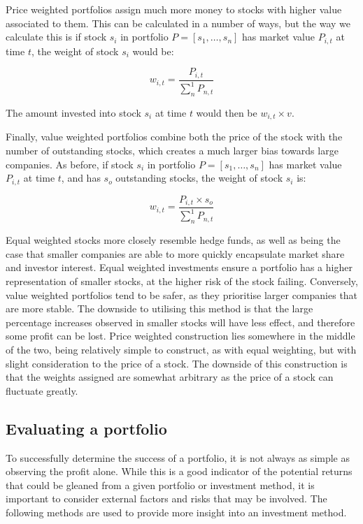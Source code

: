 Price weighted portfolios assign much more money to stocks with higher value associated to them. This can be calculated in a number of ways, but the way we calculate this is if stock $s_i$ in portfolio $P = [s_1, \dots, s_n]$ has market value $P_{i,t}$ at time $t$, the weight of stock $s_i$ would be:

\begin{equation}
w_{i,t} = \frac{P_{i,t}}{\sum_{n}^1 P_{n,t}}
\end{equation}

\noindent
The amount invested into stock $s_i$ at time $t$ would then be $w_{i,t} \times v$.

Finally, value weighted portfolios combine both the price of the stock with the number of outstanding stocks, which creates a much larger bias towards large companies. As before, if stock $s_i$ in portfolio $P=[s_1, \dots, s_n]$ has market value $P_{i,t}$ at time $t$, and has $s_o$ outstanding stocks, the weight of stock $s_i$ is:

\begin{equation}
w_{i,t} = \frac{P_{i,t} \times s_o}{\sum_{n}^1 P_{n,t}}
\end{equation}

Equal weighted stocks more closely resemble hedge funds, as well as being the case that smaller companies are able to more quickly encapsulate market share and investor interest. Equal weighted investments ensure a portfolio has a higher representation of smaller stocks, at the higher risk of the stock failing. Conversely, value weighted portfolios tend to be safer, as they prioritise larger companies that are more stable. The downside to utilising this method is that the large percentage increases observed in smaller stocks will have less effect, and therefore some profit can be lost. Price weighted construction lies somewhere in the middle of the two, being relatively simple to construct, as with equal weighting, but with slight consideration to the price of a stock. The downside of this construction is that the weights assigned are somewhat arbitrary as the price of a stock can fluctuate greatly.

\subsection{Evaluating a portfolio}
To successfully determine the success of a portfolio, it is not always as simple as observing the profit alone. While this is a good indicator of the potential returns that could be gleaned from a given portfolio or investment method, it is important to consider external factors and risks that may be involved. The following methods are used to provide more insight into an investment method.

